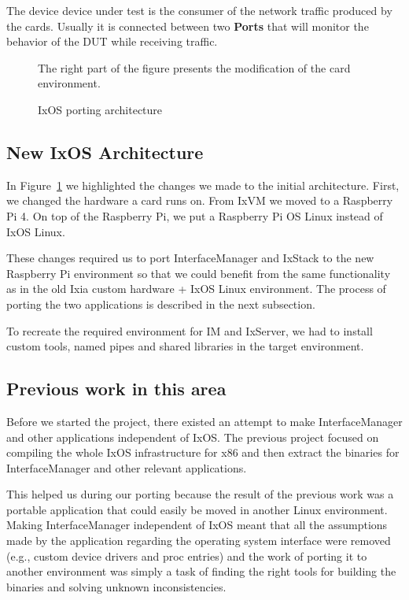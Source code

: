 The device device under test is the consumer of the network traffic produced by
the cards. Usually it is connected between two \textbf{Ports} that will monitor the
behavior of the DUT while receiving traffic.

\begin{figure}
    \centering
    \def\svgscale{0.95}
    
    \caption{IxOS porting architecture}
    \label{fig:ixos_arch}
    \medskip
    \small
    The right part of the figure presents the modification of the card
    environment.
\end{figure}

\subsection{New IxOS Architecture}

In Figure~\ref{fig:ixos_arch} we highlighted the changes we made to the initial
architecture. First, we changed the hardware a card runs on. From IxVM we moved
to a Raspberry Pi 4. On top of the Raspberry Pi, we put a Raspberry Pi OS Linux
instead of IxOS Linux.

These changes required us to port InterfaceManager and IxStack to the new
Raspberry Pi environment so that we could benefit from the same functionality as in the
old Ixia custom hardware + IxOS Linux environment. The process of porting the
two applications is described in the next subsection.

To recreate the required environment for IM and IxServer, we had to install
custom tools, named pipes and shared libraries in the target environment.

\subsection{Previous work in this area}

Before we started the project, there existed an attempt to make InterfaceManager
and other applications independent of IxOS. The previous project focused on
compiling the whole IxOS infrastructure for x86 and then extract the binaries
for InterfaceManager and other relevant applications.

This helped us during our porting because the result of the previous work was a
portable application that could easily be moved in another Linux environment.
Making InterfaceManager independent of IxOS meant that all the assumptions made
by the application regarding the operating system interface were removed (e.g.,
custom device drivers and proc entries) and the work of porting it to another
environment was simply a task of finding the right tools for building the
binaries and solving unknown inconsistencies.

